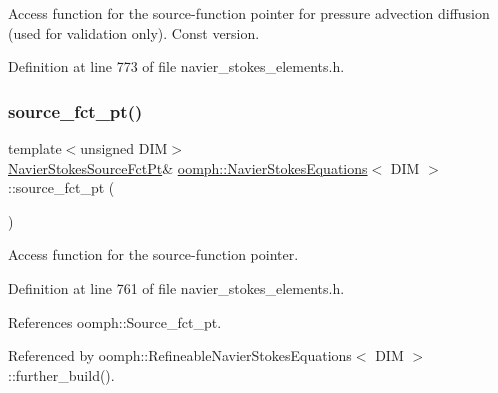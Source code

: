 Access function for the source-\/function pointer for pressure advection diffusion (used for validation only). Const version. 



Definition at line 773 of file navier\+\_\+stokes\+\_\+elements.\+h.

\mbox{\label{classoomph_1_1NavierStokesEquations_a1efac502596fb166779454eba5d0ca64}} 
\subsubsection{\texorpdfstring{source\+\_\+fct\+\_\+pt()}{source\_fct\_pt()}\hspace{0.1cm}{\footnotesize\ttfamily [1/2]}}
{\footnotesize\ttfamily template$<$unsigned D\+IM$>$ \\
\hyperlink{classoomph_1_1NavierStokesEquations_a1d69b671e6d4c0e75a02d6fa3dab478f}{Navier\+Stokes\+Source\+Fct\+Pt}\& \hyperlink{classoomph_1_1NavierStokesEquations}{oomph\+::\+Navier\+Stokes\+Equations}$<$ D\+IM $>$\+::source\+\_\+fct\+\_\+pt (\begin{DoxyParamCaption}{ }\end{DoxyParamCaption})\hspace{0.3cm}{\ttfamily [inline]}}



Access function for the source-\/function pointer. 



Definition at line 761 of file navier\+\_\+stokes\+\_\+elements.\+h.



References oomph\+::\+Source\+\_\+fct\+\_\+pt.



Referenced by oomph\+::\+Refineable\+Navier\+Stokes\+Equations$<$ D\+I\+M $>$\+::further\+\_\+build().

\mbox{\label{classoomph_1_1NavierStokesEquations_aa3cded93d6d40ad4b4fa8382db0b9979}} 
